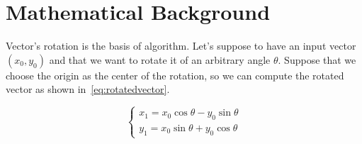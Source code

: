 \section{Mathematical Background}\label{sec:math}

Vector's rotation is the basis of \cordic{} algorithm. Let's suppose to have an
input vector \((x_0, y_0)\) and that we want to rotate it of an arbitrary angle
\(\theta\). Suppose that we choose the origin as the center of the rotation, so
we can compute the rotated vector as shown in~\eqref{eq:rotatedvector}.

\begin{equation}\label{eq:rotatedvector}
	\begin{cases}
		x_1 = x_0\cos\theta - y_0\sin\theta\\
		y_1 = x_0\sin\theta + y_0\cos\theta
	\end{cases}
\end{equation}
